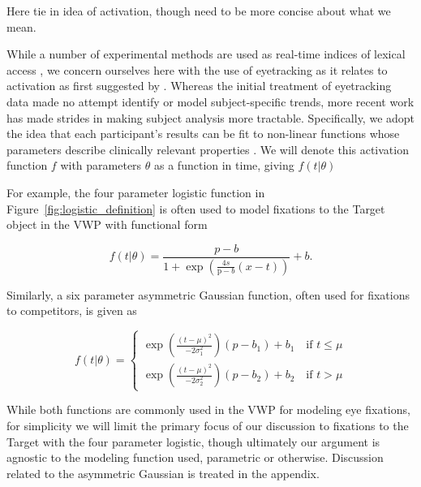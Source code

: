 Here tie in idea of activation, though need to be more concise about what we mean. 

While a number of experimental methods are used as real-time indices of lexical access \citep{Spivey2005}, we concern ourselves here with the use of eyetracking as it relates to activation as first suggested by \cite{allopenna1998tracking}. Whereas the initial treatment of eyetracking data made no attempt identify or model subject-specific trends, more recent work has made strides in making subject analysis more tractable. Specifically, we adopt the idea that each participant's results can be fit to non-linear functions whose parameters describe clinically relevant properties \cite{mcmurray2010individual}. We will denote this activation function $f$ with parameters $\theta$ as a function in time, giving $f(t|\theta)$

For example, the four parameter logistic function in Figure~\ref{fig:logistic_definition} is often used to model fixations to the Target object in the VWP with functional form

\begin{equation} \label{eq:logistic}
f(t|\theta) = \frac{p-b}{1 + \exp \left(\frac{4s}{\text{p}-b} (x - t) \right)} + b.
\end{equation}

Similarly, a six parameter asymmetric Gaussian function, often used for fixations to competitors, is given as

\begin{equation} \label{eq:dg}
f(t|\theta) = \begin{cases}
\exp \left( \frac{(t - \mu)^2}{-2\sigma_1^2} \right) (p - b_1) + b_1 \quad \text{if } t \leq \mu \\
\exp \left( \frac{(t - \mu)^2}{-2\sigma_2^2} \right) (p - b_2) + b_2 \quad \text{if } t > \mu
\end{cases}
\end{equation}



While both functions are commonly used in the VWP for modeling eye fixations, for simplicity we will limit the primary focus of our discussion to fixations to the Target with the four parameter logistic, though ultimately our argument is agnostic to the modeling function used, parametric or otherwise. Discussion related to the asymmetric Gaussian is treated in the appendix.


